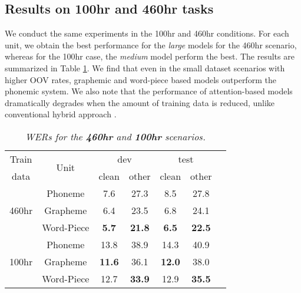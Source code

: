 \subsection{Results on 100hr and 460hr tasks}
\vspace{-2mm}
We conduct the same experiments in the 100hr and 460hr conditions.
For each unit, we obtain the best performance for the \textit{large} models
for the 460hr scenario, whereas for the 100hr case, the \textit{medium} model perform
the best. The results are summarized in Table \ref{460100overview}. We find that even
in the small dataset scenarios with higher OOV rates, graphemic and word-piece based
models outperform the phonemic system. We also note that the performance of attention-based
models dramatically degrades when the amount of training data is reduced, unlike conventional
hybrid approach \cite{panayotov2015librispeech}.
\begin{table}[h]
	\centering
	\vspace{-3mm}
	\caption{\it WERs for the \textbf{460hr} and \textbf{100hr} scenarios.}
		\vspace{-1mm}
				 	\vspace{-2mm}
	\label{460100overview}
	\begin{tabular}{ |c|c|c|c|c|c|c|} \hline
		Train   & \multirow{2}{*}{Unit} & \multicolumn{2}{|c|}{dev} & \multicolumn{2}{|c|}{test}    \\ \cline{3-6}
		data   &  & clean & other & clean & other    \\ \hline
		\multirow{3}{*}{460hr} & Phoneme&   7.6 &  27.3 & 8.5 & 27.8 \\
		& Grapheme&  6.4 & 23.5 & 6.8 &  24.1 \\ 
		& Word-Piece  & \textbf{5.7} & \textbf{21.8} & \textbf{6.5} & \textbf{22.5}  \\ \hline
		\multirow{3}{*}{100hr} &  Phoneme &  13.8 & 38.9 & 14.3 & 40.9 \\
		& Grapheme  &  \textbf{11.6} & 36.1 &  \textbf{12.0} &  38.0 \\ 
		& Word-Piece& 12.7 & \textbf{33.9} &  12.9 &  \textbf{35.5}  \\ \hline
		
	\end{tabular}
	\vspace{-5mm}
\end{table}
\vspace{-3mm}
